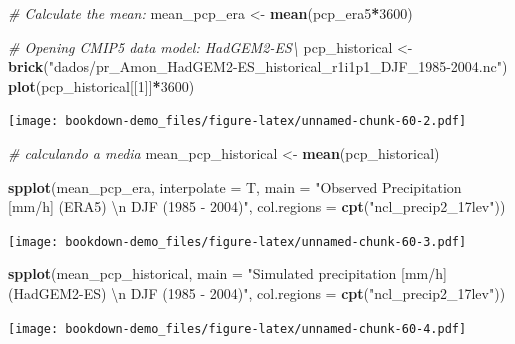 \documentclass[]{book}
\newenvironment{Shaded}{\begin{snugshade}}{\end{snugshade}}
\newcommand{\CharTok}[1]{\textcolor[rgb]{0.31,0.60,0.02}{#1}}
\newcommand{\CommentTok}[1]{\textcolor[rgb]{0.56,0.35,0.01}{\textit{#1}}}
\newcommand{\DataTypeTok}[1]{\textcolor[rgb]{0.13,0.29,0.53}{#1}}
\newcommand{\DecValTok}[1]{\textcolor[rgb]{0.00,0.00,0.81}{#1}}
\newcommand{\KeywordTok}[1]{\textcolor[rgb]{0.13,0.29,0.53}{\textbf{#1}}}
\newcommand{\NormalTok}[1]{#1}
\newcommand{\OperatorTok}[1]{\textcolor[rgb]{0.81,0.36,0.00}{\textbf{#1}}}
\newcommand{\StringTok}[1]{\textcolor[rgb]{0.31,0.60,0.02}{#1}}
\begin{document}
\begin{Shaded}
\begin{Highlighting}[]
\CommentTok{# Calculate the mean:}
\NormalTok{mean_pcp_era <-}\StringTok{ }\KeywordTok{mean}\NormalTok{(pcp_era5}\OperatorTok{*}\DecValTok{3600}\NormalTok{)}

\CommentTok{# Opening CMIP5 data model: HadGEM2-ES\textbackslash{}}
\NormalTok{pcp_historical <-}\StringTok{ }\KeywordTok{brick}\NormalTok{(}\StringTok{"dados/pr_Amon_HadGEM2-ES_historical_r1i1p1_DJF_1985-2004.nc"}\NormalTok{)}
\KeywordTok{plot}\NormalTok{(pcp_historical[[}\DecValTok{1}\NormalTok{]]}\OperatorTok{*}\DecValTok{3600}\NormalTok{)}
\end{Highlighting}
\end{Shaded}

\texttt{[image: bookdown-demo\_files/figure-latex/unnamed-chunk-60-2.pdf]}

\begin{Shaded}
\begin{Highlighting}[]
\CommentTok{# calculando a media}
\NormalTok{mean_pcp_historical <-}\StringTok{ }\KeywordTok{mean}\NormalTok{(pcp_historical)}

\KeywordTok{spplot}\NormalTok{(mean_pcp_era, }\DataTypeTok{interpolate =}\NormalTok{ T,}
            \DataTypeTok{main =} \StringTok{"Observed Precipitation [mm/h] (ERA5) }\CharTok{\textbackslash{}n}\StringTok{ DJF (1985 - 2004)"}\NormalTok{,}
            \DataTypeTok{col.regions =} \KeywordTok{cpt}\NormalTok{(}\StringTok{"ncl_precip2_17lev"}\NormalTok{))}
\end{Highlighting}
\end{Shaded}

\texttt{[image: bookdown-demo\_files/figure-latex/unnamed-chunk-60-3.pdf]}

\begin{Shaded}
\begin{Highlighting}[]
\KeywordTok{spplot}\NormalTok{(mean_pcp_historical,}
            \DataTypeTok{main =} \StringTok{"Simulated precipitation [mm/h] (HadGEM2-ES) }\CharTok{\textbackslash{}n}\StringTok{ DJF (1985 - 2004)"}\NormalTok{,}
            \DataTypeTok{col.regions =} \KeywordTok{cpt}\NormalTok{(}\StringTok{"ncl_precip2_17lev"}\NormalTok{))}
\end{Highlighting}
\end{Shaded}

\texttt{[image: bookdown-demo\_files/figure-latex/unnamed-chunk-60-4.pdf]}
\end{document}
